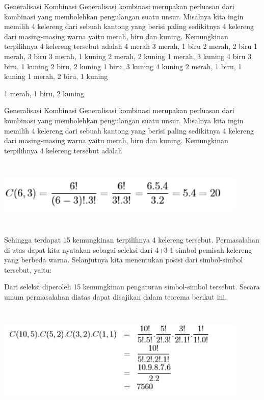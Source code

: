 \documentclass[11pt,fleqn]{book} %
\begin{document}
Generalisasi Kombinasi Generalisasi kombinasi merupakan perluasan dari kombinasi yang membolehkan pengulangan suatu unsur. Misalnya kita ingin memilih 4 kelereng dari sebuah kantong yang berisi paling sedikitnya 4 kelereng dari masing-masing warna yaitu merah, biru dan kuning. Kemungkinan terpilihnya 4 kelereng tersebut adalah
{4 merah} 				{3 merah, 1 biru} 
{2 merah, 2 biru}	 	{1 merah, 3 biru} 
{3 merah, 1 kuning} 	{2 merah, 2 kuning} 
{1 merah, 3 kuning}	 {4 biru} {3 biru, 1 kuning}
 {2 biru, 2 kuning} {1 biru, 3 kuning} {4 kuning} {2 merah, 1 biru, 1 kuning} {1 merah, 2 biru, 1 kuning} {1 merah, 1 biru, 2 kuning
 
 Generalisasi Kombinasi Generalisasi kombinasi merupakan perluasan dari kombinasi yang membolehkan pengulangan suatu unsur. Misalnya kita ingin memilih 4 kelereng dari sebuah kantong yang berisi paling sedikitnya 4 kelereng dari masing-masing warna yaitu merah, biru dan kuning. Kemungkinan terpilihnya 4 kelereng tersebut adalah
\includegraphics[width = 12cm, height= 4cm]{Pictures/herlin11.png}
Sehingga terdapat 15 kemungkinan terpilihnya 4 kelereng tersebut.
Permasalahan di atas dapat kita nyatakan sebagai seleksi dari 4+3-1 simbol
pemisah kelereng yang berbeda warna. Selanjutnya kita menentukan posisi
dari simbol-simbol tersebut, yaitu:

Dari seleksi diperoleh 15 kemungkinan pengaturan simbol-simbol tersebut.
Secara umum permasalahan diatas dapat disajikan dalam teorema berikut
ini.
\includegraphics[width = 12cm, height= 6cm]{Pictures/herlin12.png}

}
\end{document}
